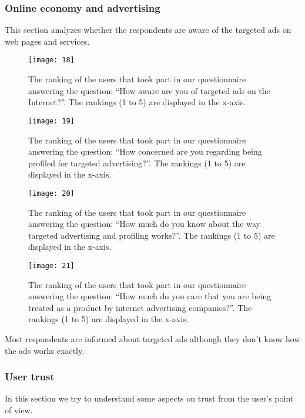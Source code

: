 \subsubsection{Online economy and advertising}

This section analyzes whether the respondents are aware of the targeted ads on 
web pages and services.

\begin{figure}[H]
\centering
\texttt{[image: 18]}
\caption{The ranking of the users that took part in our questionnaire answering
the question: ``How aware are you of targeted ads on the Internet?''. The
rankings (1 to 5) are displayed in the x-axis.}
\end{figure}

\begin{figure}[H]
\centering
\texttt{[image: 19]}
\caption{The ranking of the users that took part in our questionnaire answering
the question: ``How concerned are you regarding being profiled for targeted 
advertising?''. The rankings (1 to 5) are displayed in the x-axis.}
\end{figure}

\begin{figure}[H]
\centering
\texttt{[image: 20]}
\caption{The ranking of the users that took part in our questionnaire answering
the question: ``How much do you know about the way targeted advertising and 
profiling works?''. The rankings (1 to 5) are displayed in the x-axis.}
\end{figure}

\begin{figure}[H]
\centering
\texttt{[image: 21]}
\caption{The ranking of the users that took part in our questionnaire answering
the question: ``How much do you care that you are being treated as a product by 
internet advertising companies?''. The rankings (1 to 5) are displayed in the 
x-axis.}
\end{figure}

Most respondents are informed about targeted ads although they don't know how 
the ads works exactly.

\subsubsection{User trust}

In this section we try to understand some aspects on trust from the user's point 
of view.

